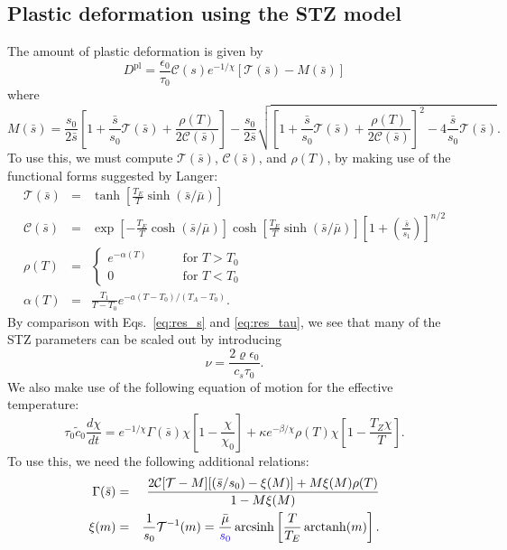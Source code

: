 \documentclass[12pt]{article}
\newcommand{\Dpl}{D^\textrm{pl}}
\newcommand{\sC}{\mathcal{C}}
\newcommand{\bs}{\bar{s}}
\newcommand{\scT}{\mathcal{T}}
\newcommand{\mub}{\bar{\mu}}
\newcommand{\q}[1]{\textcolor{Blue}{#1}}
\DeclareMathOperator{\arcsinh}{arcsinh}
\DeclareMathOperator{\arctanh}{arctanh}
\begin{document}
\subsection*{Plastic deformation using the STZ model}
The amount of plastic deformation is given by 
\begin{equation}
  \label{eq:strainrate}
  \Dpl = \frac{\epsilon_0}{\tau_0} \sC(s) e^{-1/\chi} [\scT(\bs) - M(\bs)]
\end{equation}
where
\[
M(\bs) = \frac{s_0}{2\bs} \left[1+\frac{\bs}{s_0}\scT(\bs) + \frac{\rho(T)}{2\sC(\bs)}\right]
- \frac{s_0}{2\bs} \sqrt{\left[1+\frac{\bs}{s_0} \scT(\bs) + \frac{\rho(T)}{2\sC(\bs)}\right]^2 - 4 \frac{\bs}{s_0} \scT(\bs)}.
\]
To use this, we must compute $\scT(\bs)$, $\sC(\bs)$, and $\rho(T)$, by making
use of the functional forms suggested by Langer:
\begin{eqnarray*}
  \scT(\bs) &=& \tanh \left[\frac{T_E}{T} \sinh (\bs/\mub) \right] \\
  \sC(\bs) &=& \exp \left[ - \frac{T_E}{T} \cosh (\bs/\mub) \right] \cosh\left[\frac{T_E}{T} \sinh(\bs/\mub) \right] \left[ 1+\left(\frac{\bs}{s_1}\right) \right]^{n/2} \\
  \rho(T) &=& \left\{
  \begin{array}{ll}
    e^{-\alpha(T)} & \qquad \textrm{for $T>T_0$} \\
    0 & \qquad \textrm{for $T<T_0$}
  \end{array}
  \right. \\
  \alpha(T) &=& \frac{T_1}{T-T_0} e^{-a(T-T_0)/(T_A - T_0)}.
\end{eqnarray*}
By comparison with Eqs.~\ref{eq:res_s} and \ref{eq:res_tau}, we see that
many of the STZ parameters can be scaled out by introducing
\begin{equation}
  \label{eq:nu_intro}
  \nu = \frac{2 \varrho \epsilon_0}{c_s \tau_0}.
\end{equation}
We also make use of the following equation of motion for the effective
temperature:
\begin{equation}
  \label{eq:chi}
  \tau_0 \tilde{c}_0 \frac{d\chi}{dt} = e^{-1/\chi} \Gamma(\bs) \chi \left[ 1 - \frac{\chi}{\chi_0} \right] + \kappa e^{-\beta/\chi} \rho(T) \chi \left[ 1 - \frac{T_Z\chi}{T}\right].
\end{equation}
To use this, we need the following additional relations:
\begin{eqnarray*}
\Gamma(\bs)&=& \frac{2 \sC[ \scT - M][(\bs/s_0) - \xi(M)] + M\xi(M) \rho(T)}{1-M\xi(M)} \\
\xi(m) &=& \frac{1}{s_0} \scT^{-1}(m) = \frac{\mub}{\q{s_0}} \arcsinh\left[\frac{T}{T_E} \arctanh(m)\right]. \\
\end{eqnarray*}
\end{document}

